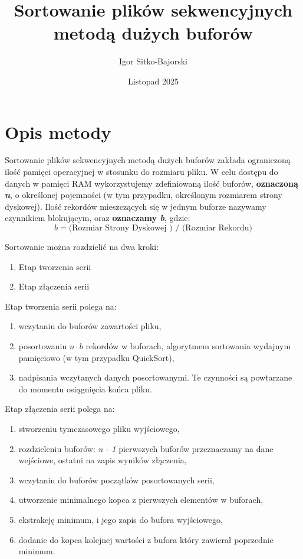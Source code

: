 \documentclass{article}
\title{Sortowanie plików sekwencyjnych metodą dużych buforów}
\author{Igor Sitko-Bajorski}
\date{Listopad 2025}
\begin{document}
\maketitle

\section{Opis metody}
Sortowanie plików sekwencyjnych metodą dużych buforów zakłada ograniczoną ilość pamięci operacyjnej w stosunku do rozmiaru pliku. W celu dostępu do danych w pamięci RAM wykorzystujemy zdefiniowaną ilość buforów, \textbf{oznaczoną \textit{n}}, o określonej pojemności (w tym przypadku, określonym rozmiarem strony dyskowej). Ilość rekordów mieszczących się w jednym buforze nazywamy czynnikiem blokującym, oraz \textbf{oznaczamy \textit{b}}, gdzie:
\[
b = \text{(Rozmiar Strony Dyskowej ) / (Rozmiar Rekordu)}
\]

Sortowanie można rozdzielić na dwa kroki:
\begin{enumerate}
    \item Etap tworzenia serii
    \item Etap złączenia serii
\end{enumerate}

Etap tworzenia serii polega na:
\begin{enumerate}
    \item wczytaniu do buforów zawartości pliku,
    \item posortowaniu \(n \cdot b\) rekordów w buforach, algorytmem sortowania wydajnym pamięciowo (w tym przypadku QuickSort),
    \item nadpisania wczytanych danych posortowanymi. Te czynności są powtarzane do momentu osiągnięcia końca pliku.
\end{enumerate}

Etap złączenia serii polega na: 
\begin{enumerate}
    \item stworzeniu tymczasowego pliku wyjściowego,
    \item rozdzieleniu buforów: \textit{n - 1} pierwszych buforów przeznaczamy na dane wejściowe, ostatni na zapis wyników złączenia,
    \item wczytaniu do buforów początków posortowanych serii,
    \item utworzenie minimalnego kopca z pierwszych elementów w buforach,
    \item ekstrakcję minimum, i jego zapis do bufora wyjściowego,
    \item dodanie do kopca kolejnej wartości z bufora który zawierał poprzednie minimum.
\end{enumerate}
\end{document}
